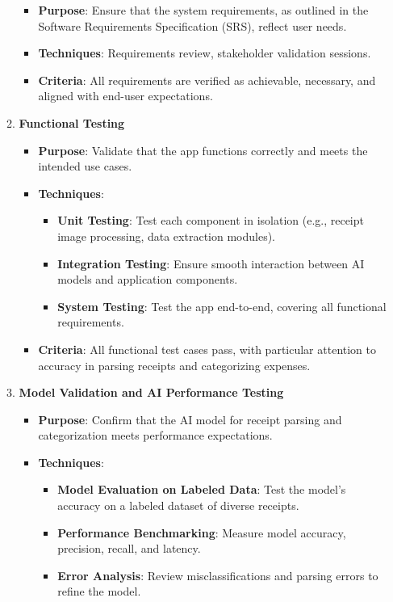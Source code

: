 \documentclass[12pt, titlepage]{article}
\begin{document}
\begin{enumerate}
\begin{enumerate}
		\begin{itemize}
			\item \textbf{Purpose}: Ensure that the system requirements, as outlined in the Software Requirements Specification (SRS), reflect user needs.
			\item \textbf{Techniques}: Requirements review, stakeholder validation sessions.
			\item \textbf{Criteria}: All requirements are verified as achievable, necessary, and aligned with end-user expectations.
		\end{itemize}
		\item \textbf{Functional Testing}
		\begin{itemize}
			\item \textbf{Purpose}: Validate that the app functions correctly and meets the intended use cases.
			\item \textbf{Techniques}:
			\begin{itemize}
				\item \textbf{Unit Testing}: Test each component in isolation (e.g., receipt image processing, data extraction modules).
				\item \textbf{Integration Testing}: Ensure smooth interaction between AI models and application components.
				\item \textbf{System Testing}: Test the app end-to-end, covering all functional requirements.
			\end{itemize}
			\item \textbf{Criteria}: All functional test cases pass, with particular attention to accuracy in parsing receipts and categorizing expenses.
		\end{itemize}
		\item \textbf{Model Validation and AI Performance Testing}
		\begin{itemize}
			\item \textbf{Purpose}: Confirm that the AI model for receipt parsing and categorization meets performance expectations.
			\item \textbf{Techniques}:
			\begin{itemize}
				\item \textbf{Model Evaluation on Labeled Data}: Test the model's accuracy on a labeled dataset of diverse receipts.
				\item \textbf{Performance Benchmarking}: Measure model accuracy, precision, recall, and latency.
				\item \textbf{Error Analysis}: Review misclassifications and parsing errors to refine the model.

\end{itemize}
\end{itemize}
\end{enumerate}
\end{enumerate}
\end{document}
